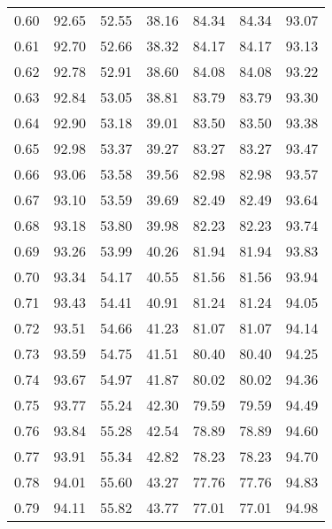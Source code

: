 \begin{tabular}{|c|c|c|c|c|c|c|}
      0.60 &     92.65 &     52.55 &      38.16 &   84.34 &      84.34 &         93.07 \\
      0.61 &     92.70 &     52.66 &      38.32 &   84.17 &      84.17 &         93.13 \\
      0.62 &     92.78 &     52.91 &      38.60 &   84.08 &      84.08 &         93.22 \\
      0.63 &     92.84 &     53.05 &      38.81 &   83.79 &      83.79 &         93.30 \\
      0.64 &     92.90 &     53.18 &      39.01 &   83.50 &      83.50 &         93.38 \\
      0.65 &     92.98 &     53.37 &      39.27 &   83.27 &      83.27 &         93.47 \\
      0.66 &     93.06 &     53.58 &      39.56 &   82.98 &      82.98 &         93.57 \\
      0.67 &     93.10 &     53.59 &      39.69 &   82.49 &      82.49 &         93.64 \\
      0.68 &     93.18 &     53.80 &      39.98 &   82.23 &      82.23 &         93.74 \\
      0.69 &     93.26 &     53.99 &      40.26 &   81.94 &      81.94 &         93.83 \\
      0.70 &     93.34 &     54.17 &      40.55 &   81.56 &      81.56 &         93.94 \\
      0.71 &     93.43 &     54.41 &      40.91 &   81.24 &      81.24 &         94.05 \\
      0.72 &     93.51 &     54.66 &      41.23 &   81.07 &      81.07 &         94.14 \\
      0.73 &     93.59 &     54.75 &      41.51 &   80.40 &      80.40 &         94.25 \\
      0.74 &     93.67 &     54.97 &      41.87 &   80.02 &      80.02 &         94.36 \\
      0.75 &     93.77 &     55.24 &      42.30 &   79.59 &      79.59 &         94.49 \\
      0.76 &     93.84 &     55.28 &      42.54 &   78.89 &      78.89 &         94.60 \\
      0.77 &     93.91 &     55.34 &      42.82 &   78.23 &      78.23 &         94.70 \\
      0.78 &     94.01 &     55.60 &      43.27 &   77.76 &      77.76 &         94.83 \\
      0.79 &     94.11 &     55.82 &      43.77 &   77.01 &      77.01 &         94.98 \\

\end{tabular}
